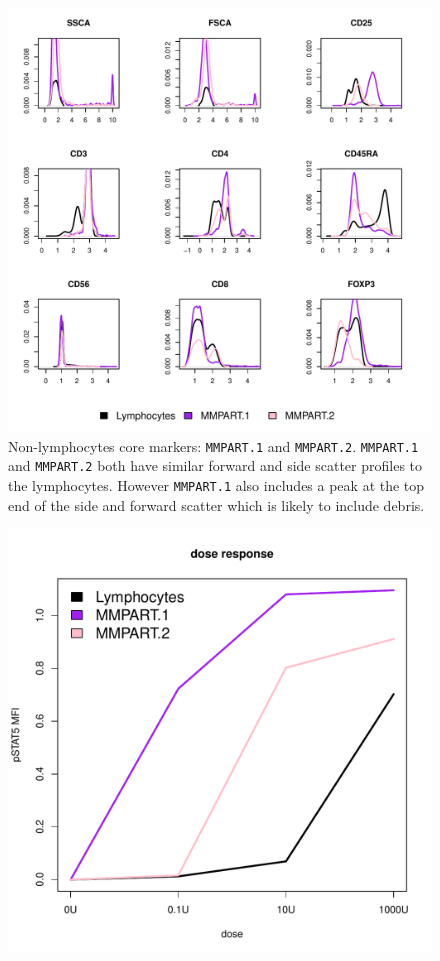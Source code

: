 %
\begin{figure}
\centering
\begin{minipage}{.9\textwidth}
\includegraphics[width=\linewidth]{figures/mmpart-nonlymphocytes-clusters}
{Non-lymphocytes core markers: \texttt{MMPART.1} and \texttt{MMPART.2}. }
{
\texttt{MMPART.1} and \texttt{MMPART.2} both have similar forward and side scatter profiles to the lymphocytes.
However \texttt{MMPART.1} also includes a peak at the top end of the side and forward scatter which is likely to include debris.
}
\end{minipage}
%
\begin{minipage}{.5\textwidth}
  \includegraphics[width=\linewidth]{figures/mmpart-nonlymphocytes-dose-response}

\end{minipage}
\end{figure}
